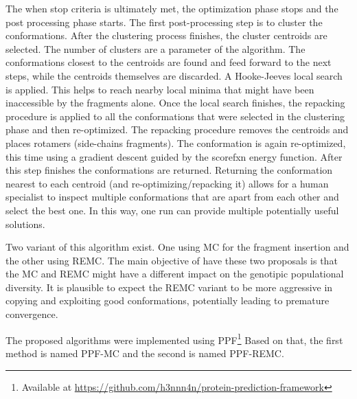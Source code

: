 The when stop criteria is ultimately met, the optimization phase stops and the
post processing phase starts. The first post-processing step is to cluster the
conformations. After the clustering process finishes, the cluster centroids are
selected. The number of clusters are a parameter of the algorithm.
The conformations closest to the centroids are found and feed forward
to the next steps, while the centroids themselves are discarded. A Hooke-Jeeves
local search is applied. This helps to reach nearby local minima that might have
been inaccessible by the fragments alone. Once the local search finishes, the
repacking procedure is applied to all the conformations that were selected in
the clustering phase and then re-optimized. The repacking procedure removes the
centroids and places rotamers (side-chains fragments). The conformation is again
re-optimized, this time using a gradient descent guided by the scorefxn energy
function. After this step finishes the conformations are returned. Returning
the conformation nearest to each centroid (and re-optimizing/repacking it) allows
for a human specialist to inspect multiple conformations that are apart from
each other and select the best one. In this way, one run can provide multiple
potentially useful solutions.

Two variant of this algorithm exist. One using \ac{MC} for the fragment insertion
and the other using \ac{REMC}.
The main objective of have these two proposals is that the \ac{MC} and \ac{REMC}
might have a different impact on the genotipic populational diversity. It is
plausible to expect the \ac{REMC} variant to be more aggressive in copying and
exploiting good conformations, potentially leading to premature convergence.

The proposed algorithms were implemented using
\ac{PPF}\footnote{Available at
\url{https://github.com/h3nnn4n/protein-prediction-framework}}
Based on that, the
first method is named PPF-MC and the second is named PPF-REMC.
